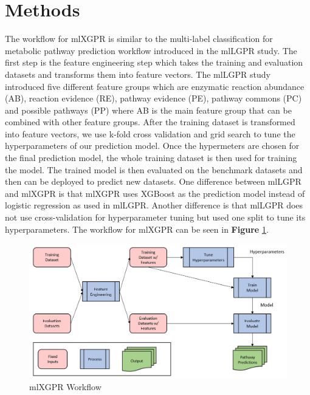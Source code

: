 \documentclass[sn-mathphys,Numbered]{sn-jnl}%
\theoremstyle{thmstyleone}%
\theoremstyle{thmstyletwo}%
\theoremstyle{thmstylethree}%
\begin{document}
\section{Methods}\label{sec2}
The workflow for mlXGPR is similar to the multi-label classification for metabolic pathway prediction workflow introduced in the mlLGPR study.
The first step is the feature engineering step which takes the training and evaluation datasets and transforms them into feature vectors.
The mlLGPR study introduced five different feature groups which are enzymatic reaction abundance (AB), reaction evidence (RE), pathway evidence (PE), pathway commons (PC) and possible pathways (PP) where AB is the main feature group that can be combined with other feature groups.
After the training dataset is transformed into feature vectors, we use k-fold cross validation and grid search to tune the hyperparameters of our prediction model.
Once the hypermeters are chosen for the final prediction model, the whole training dataset is then used for training the model.
The trained model is then evaluated on the benchmark datasets and then can be deployed to predict new datasets.
One difference between mlLGPR and mlXGPR is that mlXGPR uses XGBoost as the prediction model instead of logistic regression as used in mlLGPR.
Another difference is that mlLGPR does not use cross-validation for hyperparameter tuning but used one split to tune its hyperparameters.
The workflow for mlXGPR can be seen in \textbf{Figure} \ref{fig:2}.

\begin{figure}[ht]
\centering
\includegraphics[width=12cm]{Figure 2}
\caption{mlXGPR Workflow}
\label{fig:2}
\end{figure}
\end{document}
